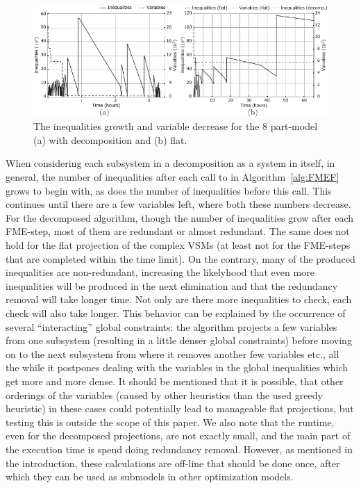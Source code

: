 \documentclass{llncs}
\begin{document}
\begin{figure}[tb]
	\centering
		\includegraphics{figures/newDecompFig.pdf}
	\caption{The inequalities growth and variable decrease for the 8 part-model (a) with decomposition and (b) flat.}
	\label{fig:8parts}
\end{figure}

When considering each subsystem in a decomposition as a system in itself, in general, the number of inequalities after each call to  in Algorithm~\ref{alg:FMEF} grows to begin with, as does the number of inequalities before this call. This continues until there are a few variables left, where both these numbers decrease. %
%
For the decomposed algorithm, though the number of inequalities grow after each FME-step, most of them are redundant or almost redundant. The same does not hold for the flat projection of the complex VSMs (at least not for the FME-steps that are completed within the time limit). On the contrary, many of the produced inequalities are non-redundant, increasing the likelyhood that even more inequalities will be produced in the next elimination and that the redundancy removal will take longer time. Not only are there more inequalities to check, each check will also take longer. %
This behavior can be explained by the occurrence of several ``interacting'' global constraints: the algorithm projects a few variables from one subsystem (resulting in a little denser global constraints) before moving on to the next subsystem from where it removes another few variables etc., all the while it postpones dealing with the variables in the global inequalities which get more and more dense. It should be mentioned that it is possible, that other orderings of the variables (caused by other heuristics than the used greedy heuristic) in these cases could potentially lead to manageable flat projections, but testing this is outside the scope of this paper.  
We also note that the runtime, even for the decomposed projections, are not exactly small, and the main part of the execution time is spend doing redundancy removal. However, as mentioned in the introduction, these calculations are off-line that should be done once, after which they can be used as submodels in other optimization models.  
\end{document}
